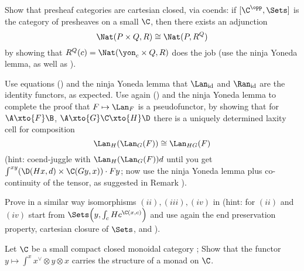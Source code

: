 \begin{exerciseset}
\begin{exercisepoints}
\item \label{closed.via.coends} Show that presheaf categories are cartesian closed, via coends: if $[\C^\opp,\Sets]$ is the category of presheaves on a small $\C$, then there exists an adjunction
\[
\Nat(P\times Q, R)\cong \Nat(P, R^Q)
\]
by showing that $R^Q(c) = \Nat(\yon_c\times Q, R)$ does the job (use the ninja Yoneda lemma, as well as \athm{}).
\item Use equations () and the ninja Yoneda lemma that $\Lan_\text{id}$ and $\Ran_\text{id}$ are the identity functors, as expected. Use again () and the ninja Yoneda lemma to complete the proof that $F\mapsto \Lan_F$ is a pseudofunctor, by showing that for $\A \xto{F}\B$, $\A\xto{G}\C\xto{H}\D$ there is a uniquely determined laxity cell for composition
\[
\Lan_H(\Lan_G(F))\cong \Lan_{HG}(F)
\]
(hint: coend-juggle with $\Lan_H(\Lan_G(F))d$ until you get $\int^{xy}(\D(Hx, d)\times \C(Gy, x))\cdot Fy$; now use the ninja Yoneda lemma plus co-continuity of the tensor, as suggested in Remark ).
\item Prove in a similar way isomorphisms $(ii), (iii), (iv)$ in \athm{} (hint: for $(ii)$ and $(iv)$ start from $\Sets\Big(y, \int_cHc^{\C(x,c)}\Big)$ and use again the end preservation property, cartesian closure of $\Sets$, and \athm{}).
\item Let $\C$ be a small compact closed monoidal category \cite{MR0470024}; Show that the functor $y\mapsto \int^x x^\lor \otimes y \otimes x$ carries the structure of a monad on $\C$.
\end{exercisepoints}
\end{exerciseset}